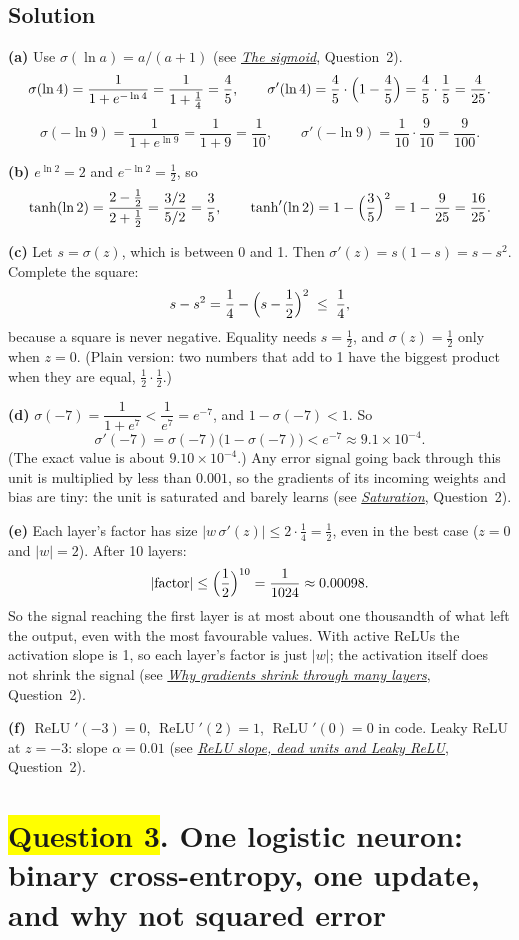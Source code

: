 \documentclass[12pt,a4paper]{article}
\newcommand{\seeconcept}[3]{(see \hyperref[#1]{\textit{#2}}, Question~#3)}
\newcommand{\relu}{\operatorname{ReLU}}
\newcommand{\hlq}[1]{{\setlength{\fboxsep}{1.5pt}\colorbox{yellow}{#1}}}
\begin{document}
\subsection*{Solution}
\textbf{(a)} Use $\sigma(\ln a)=a/(a+1)$ \seeconcept{c:sigmoid}{The sigmoid}{2}.
\[
\sigma(\ln 4)=\frac{1}{1+e^{-\ln4}}=\frac{1}{1+\frac14}=\frac45,\qquad
\sigma'(\ln4)=\frac45\cdot\Bigl(1-\frac45\Bigr)=\frac45\cdot\frac15=\frac{4}{25}.
\]
\[
\sigma(-\ln 9)=\frac{1}{1+e^{\ln9}}=\frac{1}{1+9}=\frac{1}{10},\qquad
\sigma'(-\ln9)=\frac1{10}\cdot\frac9{10}=\frac{9}{100}.
\]

\textbf{(b)} $e^{\ln2}=2$ and $e^{-\ln2}=\tfrac12$, so
\[
\tanh(\ln2)=\frac{2-\frac12}{2+\frac12}=\frac{3/2}{5/2}=\frac35,\qquad
\tanh'(\ln2)=1-\Bigl(\frac35\Bigr)^2=1-\frac{9}{25}=\frac{16}{25}.
\]

\textbf{(c)} Let $s=\sigma(z)$, which is between 0 and 1. Then $\sigma'(z)=s(1-s)=s-s^2$. Complete the square:
\[
s-s^2=\frac14-\Bigl(s-\frac12\Bigr)^2\;\le\;\frac14,
\]
because a square is never negative. Equality needs $s=\tfrac12$, and $\sigma(z)=\tfrac12$ only when $z=0$. (Plain version: two numbers that add to 1 have the biggest product when they are equal, $\tfrac12\cdot\tfrac12$.)

\textbf{(d)} $\sigma(-7)=\dfrac{1}{1+e^{7}}<\dfrac{1}{e^{7}}=e^{-7}$, and $1-\sigma(-7)<1$. So
\[
\sigma'(-7)=\sigma(-7)\bigl(1-\sigma(-7)\bigr) < e^{-7}\approx 9.1\times10^{-4}.
\]
(The exact value is about $9.10\times10^{-4}$.) Any error signal going back through this unit is multiplied by less than $0.001$, so the gradients of its incoming weights and bias are tiny: the unit is saturated and barely learns \seeconcept{c:saturation}{Saturation}{2}.

\textbf{(e)} Each layer's factor has size $|w\,\sigma'(z)|\le 2\cdot\tfrac14=\tfrac12$, even in the best case ($z=0$ and $|w|=2$). After 10 layers:
\[
|\text{factor}|\le\Bigl(\frac12\Bigr)^{10}=\frac{1}{1024}\approx 0.00098 .
\]
So the signal reaching the first layer is at most about one thousandth of what left the output, even with the most favourable values. With active ReLUs the activation slope is 1, so each layer's factor is just $|w|$; the activation itself does not shrink the signal \seeconcept{c:vanish}{Why gradients shrink through many layers}{2}.

\textbf{(f)} $\relu'(-3)=0$, $\relu'(2)=1$, $\relu'(0)=0$ in code. Leaky ReLU at $z=-3$: slope $\alpha=0.01$ \seeconcept{c:reluderiv}{ReLU slope, dead units and Leaky ReLU}{2}.

\section[Question 3. One logistic neuron: binary cross-entropy, one update, and why not squared error]{\hlq{Question 3}. One logistic neuron: binary cross-entropy, one update, and why not squared error}
\end{document}
